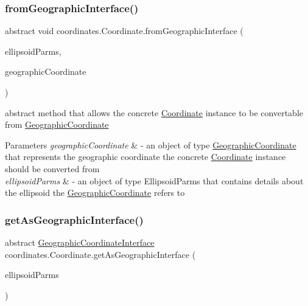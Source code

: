 \subsubsection{\texorpdfstring{from\+Geographic\+Interface()}{fromGeographicInterface()}}
{\footnotesize\ttfamily abstract void coordinates.\+Coordinate.\+from\+Geographic\+Interface (\begin{DoxyParamCaption}\item[{\hyperlink{classparams_1_1_ellipsoid_parms}{Ellipsoid\+Parms}}]{ellipsoid\+Parms,  }\item[{\hyperlink{classcoordinates_1_1_geographic_coordinate_interface}{Geographic\+Coordinate\+Interface}}]{geographic\+Coordinate }\end{DoxyParamCaption})\hspace{0.3cm}{\ttfamily [abstract]}}



abstract method that allows the concrete \hyperlink{classcoordinates_1_1_coordinate}{Coordinate} instance to be convertable from \hyperlink{classcoordinates_1_1_geographic_coordinate}{Geographic\+Coordinate} 


\begin{DoxyParams}{Parameters}
{\em geographic\+Coordinate} & -\/ an object of type \hyperlink{classcoordinates_1_1_geographic_coordinate}{Geographic\+Coordinate} that represents the geographic coordinate the concrete \hyperlink{classcoordinates_1_1_coordinate}{Coordinate} instance should be converted from \\
\hline
{\em ellipsoid\+Parms} & -\/ an object of type Ellipsoid\+Parms that contains details about the ellipsoid the \hyperlink{classcoordinates_1_1_geographic_coordinate}{Geographic\+Coordinate} refers to \\
\hline
\end{DoxyParams}
\mbox{\label{classcoordinates_1_1_coordinate_a97342479914743d999cef4b38f9124ed}} 
\subsubsection{\texorpdfstring{get\+As\+Geographic\+Interface()}{getAsGeographicInterface()}}
{\footnotesize\ttfamily abstract \hyperlink{classcoordinates_1_1_geographic_coordinate_interface}{Geographic\+Coordinate\+Interface} coordinates.\+Coordinate.\+get\+As\+Geographic\+Interface (\begin{DoxyParamCaption}\item[{\hyperlink{classparams_1_1_ellipsoid_parms}{Ellipsoid\+Parms}}]{ellipsoid\+Parms }\end{DoxyParamCaption})\hspace{0.3cm}{\ttfamily [abstract]}}



